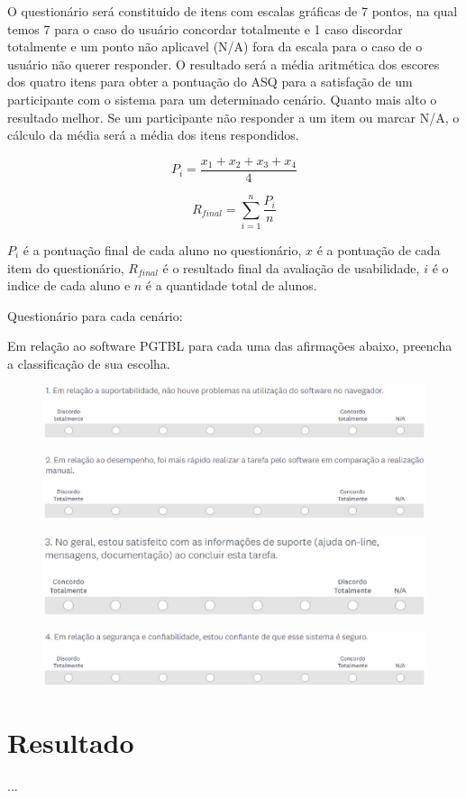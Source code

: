 O questionário será constituido de itens com escalas gráficas de 7 pontos, na qual temos 7 para o caso do usuário concordar
totalmente e 1 caso discordar totalmente e um ponto não aplicavel (N/A) fora da escala para o caso de o usuário não
querer responder. O resultado será a média aritmética dos escores dos quatro itens para obter a pontuação do ASQ para a
satisfação de um participante com o sistema para um determinado cenário. Quanto mais alto o resultado melhor. Se um
participante não responder a um item ou marcar N/A, o cálculo da média será a média dos itens respondidos.

$$P_{i} = \frac{x_{1} + x_{2} + x_{3} + x_{4}}{4}$$

$$R_{final} = \sum_{i=1}^{n} \frac{P_{i}}{n}$$

$P_i$ é a pontuação final de cada aluno no questionário, $x$ é a pontuação de cada item do questionário, $R_{final}$ é o resultado final da avaliação de usabilidade,
$i$ é o indice de cada aluno e $n$ é a quantidade total de alunos.

Questionário para cada cenário:

Em relação ao software PGTBL para cada uma das afirmações abaixo, preencha a classificação de sua escolha.

\begin{figure}[h!]
  \centering
  \includegraphics[keepaspectratio=true,scale=0.5]{figuras/p1.eps}
\end{figure}

\begin{figure}[h!]
  \centering
  \includegraphics[keepaspectratio=true,scale=0.5]{figuras/p2.eps}
\end{figure}

\begin{figure}[h!]
  \centering
  \includegraphics[keepaspectratio=true,scale=0.5]{figuras/p3.eps}
\end{figure}

\begin{figure}[h!]
  \centering
  \includegraphics[keepaspectratio=true,scale=0.5]{figuras/p4.eps}
\end{figure}

\section{Resultado}

...
